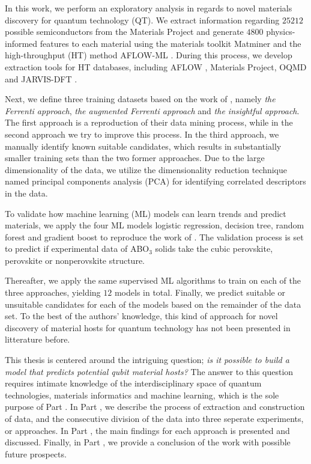 In this work, we perform an exploratory analysis in regards to novel materials discovery for quantum technology (QT). We extract information regarding $25212$ possible semiconductors from the Materials Project \cite{Jain2013, Jain2016, Jain2018} and generate $4800$ physics-informed features to each material using the materials toolkit Matminer \cite{Ward2018} and the high-throughput (HT) method AFLOW-ML \cite{Isayev2017}.
During this process, we develop extraction tools for HT databases, including AFLOW \cite{Curtarolo2012, Curtarolo2012a, Calderon2015}, Materials Project, OQMD \cite{Saal2013, Kirklin2015} and JARVIS-DFT \cite{Choudhary2020}.

Next, we define three training datasets based on the work of \citeauthor{Ferrenti2020} \cite{Ferrenti2020}, namely \textit{the Ferrenti approach}, \textit{the augmented Ferrenti approach} and \textit{the insightful approach}. The first approach is a reproduction of their data mining process, while in the second approach we try to improve this process. In the third approach, we manually identify known suitable candidates, which results in substantially smaller training sets than the two former approaches. Due to the large dimensionality of the data, we utilize the dimensionality reduction technique named principal components analysis (PCA) for identifying correlated descriptors in the data.

To validate how machine learning (ML) models can learn trends and predict materials, we apply the four ML models logistic regression, decision tree, random forest and gradient boost to reproduce the work of \citeauthor{Balachandran2018} \cite{Balachandran2018}. The validation process is set to predict if experimental data of ABO$_3$ solids take the cubic perovskite, perovskite or nonperovskite structure.

Thereafter, we apply the same supervised ML algorithms to train on each of the three approaches, yielding $12$ models in total. Finally, we predict suitable or unsuitable candidates for each of the models based on the remainder of the data set. To the best of the authors' knowledge, this kind of approach for novel discovery of material hosts for quantum technology has not been presented in litterature before. %

This thesis is centered around the intriguing question; \textit{is it possible to build a model that predicts potential qubit material hosts?} The answer to this question requires intimate knowledge of the interdisciplinary space of quantum technologies, materials informatics and machine learning, which is the sole purpose of Part .
In Part , we describe the process of extraction and construction of data, and the consecutive division of the data into three seperate experiments, or approaches. In Part , the main findings for each approach is presented and discussed. Finally, in Part , we provide a conclusion of the work with possible future prospects.



